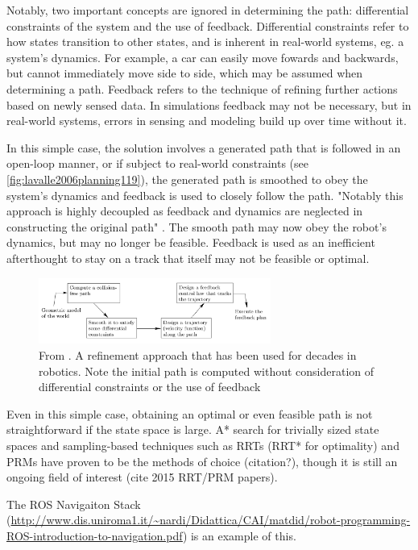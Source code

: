 Notably, two important concepts are ignored in determining the path:
differential constraints of the system and the use of feedback. Differential
constraints refer to how states transition to other states, and is inherent in
real-world systems, eg. a system's dynamics. For example, a car can easily move
fowards and backwards, but cannot immediately move side to side, which may be
assumed when determining a path. Feedback refers to the technique of refining
further actions based on newly sensed data. In simulations feedback may not be
necessary, but in real-world systems, errors in sensing and modeling build up
over time without it.

In this simple case, the solution involves a generated path that is followed in
an open-loop manner, or if subject to real-world constraints (see
\autoref{fig:lavalle2006planning119}), the generated path is smoothed to obey
the system's dynamics and feedback is used to closely follow the path. "Notably
this approach is highly decoupled as feedback and dynamics are neglected in
constructing the original path" \cite{lavalle2006planning}. The smooth path may
now obey the robot's dynamics, but may no longer be feasible. Feedback is used
as an inefficient afterthought to stay on a track that itself may not be
feasible or optimal.

\begin{figure}
\centering
\includegraphics[width=3in]{figures/lavalle2006planning119.png}
\caption{From \cite{lavalle2006planning}. A refinement approach that has been
used for decades in robotics. Note the initial path is computed without
consideration of differential constraints or the use of feedback}
\label{fig:lavalle2006planning119}
\end{figure}

Even in this simple case, obtaining an optimal or even feasible path is not
straightforward if the state space is large. A* search for trivially sized state
spaces and sampling-based techniques such as RRTs (RRT* for optimality) and PRMs
have proven to be the methods of choice (citation?), though it is still an
ongoing field of interest (cite 2015 RRT/PRM papers).

The ROS Navigaiton Stack
(\url{http://www.dis.uniroma1.it/~nardi/Didattica/CAI/matdid/robot-programming-ROS-introduction-to-navigation.pdf})
is an example of this.
